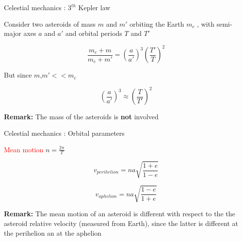 \documentclass{beamer}
\begin{document}
\begin{frame}{Celestial mechanics \cite{murray1999solar}: $3^{th}$ Kepler law}

\begin{center}
Consider two asteroids of mass $m$ and $m'$ orbiting the Earth $m_{c}$ , with semi-major axes $a$ and $a'$ and orbital periods $T$ and $T'$
\end{center}

\begin{equation}
\frac{m_{c}+m}{m_{c}+m'}=\left(\frac{a}{a'}\right)^{3}\left(\frac{T'}{T}\right)^{2}
\end{equation}

But since $m$,$m'<<m_{c}$

\begin{equation}
\left(\frac{a}{a'}\right)^{3}\approx \left(\frac{T}{T'}\right)^{2}
\end{equation}


\begin{center}
\textbf{Remark:} The mass of the asteroids is \textbf{not} involved
\end{center}


\end{frame}

\begin{frame}{Celestial mechanics \cite{murray1999solar}: Orbital parameters}
\begin{center}
\textcolor{red}{Mean motion} $n=\frac{2\pi}{T}$
\end{center}

\begin{equation}
v_{perihelion}=na\sqrt{\dfrac{1+e}{1-e}}
\end{equation}

\begin{equation}
v_{aphelion}=na\sqrt{\dfrac{1-e}{1+e}}
\end{equation}

\begin{center}
\textbf{Remark:} The mean motion of an asteroid is different with respect to the the asteroid relative velocity (measured from Earth), since the latter is different at the perihelion an at the aphelion
\end{center}



\end{frame}
\end{document}
